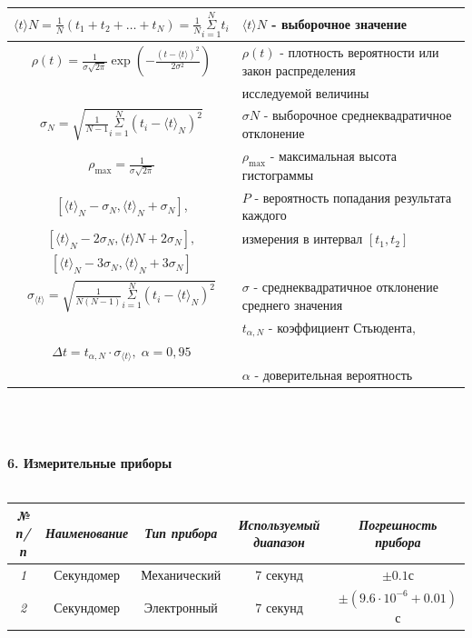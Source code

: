 \documentclass[14pt]{article}
\begin{document}
	\begin{tabular}{| c | l |}
		\hline
		$\langle t \rangle N=\frac{1}{N}(t_1+t_2+\dots+t_N)=\frac{1}{N}\overset{N}{\underset{i=1}{\Sigma}}t_i$ & $\langle t \rangle N$ - выборочное значение \\ \hline 
		$\rho(t)=\frac{1}{\sigma \sqrt{2 \pi}}\exp \left(-\frac{(t-\langle t \rangle )^2}{2\sigma^2}\right)$ & $\rho(t)$ - плотность вероятности или закон распределения\\ 
		& исследуемой величины  \\
		\hline
		$\sigma_N = \sqrt{\frac{1}{N-1}\overset{N}{\underset{i=1}{\Sigma}}(t_i-\langle t \rangle_N)^2}$ & $\sigma N$ - выборочное среднеквадратичное отклонение \\
		\hline 
		$\rho_{\max}=\frac{1}{\sigma\sqrt{2\pi}}$ & $\rho_{\max}$ - максимальная высота гистограммы \\
		\hline 
		$[\langle t \rangle_N - \sigma_N ,\langle t \rangle_N + \sigma_N]$, & $P$ - вероятность попадания результата каждого \\
		$[\langle t \rangle_N - 2 \sigma_N,\langle t \rangle N + 2\sigma_N],$ & измерения в интервал $[t_1,t_2]$ \\
		$[\langle t \rangle_N - 3 \sigma_N, \langle t \rangle_N + 3 \sigma_N]$ & \\
		\hline
		$\sigma_{\langle t \rangle }=\sqrt{\frac{1}{N(N-1)}\overset{N}{\underset{i=1}{\Sigma}}(t_i-\langle t \rangle_N)^2}$ & $\sigma$ - среднеквадратичное отклонение среднего значения \\
		\hline 
		& $t_{\alpha,N}$ - коэффициент Стьюдента,\\$\Delta t = t_{\alpha,N} \cdot \sigma_{\langle t \rangle},\; \alpha = 0,95$  & \\
		&  $\alpha$ - доверительная вероятность \\
		\hline
	\end{tabular} \\ \\ \\
	\textbf{6. Измерительные приборы} \\ \\
	\begin{tabular}{|c|c|c|c|c|}
		\hline
		\textit{№ п/п} & \textit{Наименование} & \textit{Тип прибора} & \textit{Используемый диапазон} & \textit{Погрешность прибора} \\
		\hline
		\textit{1} & Секундомер & Механический & 7 секунд & $\pm 0.1$с \\
		\hline 
		\textit{2} & Секундомер & Электронный & 7 секунд & $\pm (9.6 \cdot 10^{-6}+0.01)$с \\
		\hline
	\end{tabular} \\ \\ \\
\end{document}
